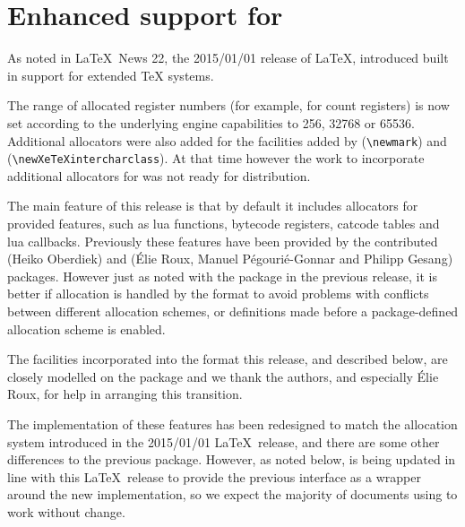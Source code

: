 \documentclass{ltnews}
\begin{document}
\maketitle

\tableofcontents

\section{Enhanced support for }

As noted in \LaTeX\ News 22, the 2015/01/01 release of \LaTeX,
introduced built in support for extended TeX systems.

The range of allocated register numbers (for example, for count
registers) is now set according to the underlying engine capabilities
to 256, 32768 or 65536. Additional allocators were also added for the
facilities added by  (\verb|\newmark|) and 
(\verb|\newXeTeXintercharclass|). At that time however the work to
incorporate additional allocators for  was not ready for
distribution.

The main feature of this release is  that by default it includes
allocators for  provided features, such as lua
functions, bytecode registers, catcode tables and lua callbacks.
Previously these features have been provided by the contributed
 (Heiko Oberdiek) and 
(\'{E}lie Roux,
  Manuel P\'{e}gouri\'{e}-Gonnar and Philipp Gesang)
packages. However just as
noted with the  package in the previous release, it is
better if allocation is handled by the format to avoid problems with
conflicts between different allocation schemes, or definitions made
before a package-defined allocation scheme is enabled.

The facilities incorporated into the format this release, and
described below, are closely modelled on the 
package and we thank the authors, and especially \'{E}lie Roux, for
help in arranging this transition.

The implementation of these  features has been
redesigned to match the allocation system introduced in the 2015/01/01
\LaTeX\ release, and there are some other differences to the previous
 package. However, as noted below,
 is being updated in line with this \LaTeX\ release
to provide the previous interface as a wrapper around the new
implementation, so we expect the majority of documents using
 to work without change.
\end{document}
